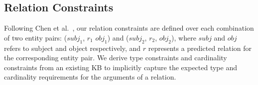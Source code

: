

\subsection{Relation Constraints}
\label{sec:constraints}



Following Chen et al.~, our relation constraints are defined over each combination of two entity pairs: ($subj_1$, $r_1$ $obj_1$) and ($subj_2$,  $r_2$, $obj_2$),
where $subj$ and $obj$ refers to subject and object respectively, and $r$ represents a predicted relation for the corresponding entity pair.
We derive type constraints and cardinality constraints from an existing KB to implicitly capture the expected type and cardinality requirements for the arguments of a relation. 
